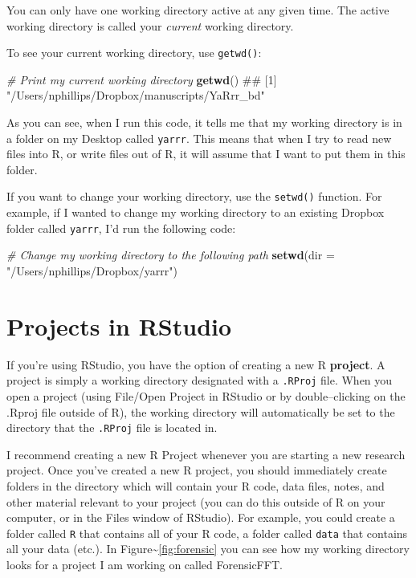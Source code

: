 \documentclass[]{book}
\newenvironment{Shaded}{\begin{snugshade}}{\end{snugshade}}
\newcommand{\KeywordTok}[1]{\textcolor[rgb]{0.13,0.29,0.53}{\textbf{{#1}}}}
\newcommand{\DataTypeTok}[1]{\textcolor[rgb]{0.13,0.29,0.53}{{#1}}}
\newcommand{\StringTok}[1]{\textcolor[rgb]{0.31,0.60,0.02}{{#1}}}
\newcommand{\CommentTok}[1]{\textcolor[rgb]{0.56,0.35,0.01}{\textit{{#1}}}}
\newcommand{\NormalTok}[1]{{#1}}
\theoremstyle{definition}
\theoremstyle{definition}
\theoremstyle{remark}
\begin{document}
You can only have one working directory active at any given time. The
active working directory is called your \emph{current} working
directory.

To see your current working directory, use \texttt{getwd()}:

\begin{Shaded}
\begin{Highlighting}[]
\CommentTok{# Print my current working directory}
\KeywordTok{getwd}\NormalTok{()}
\NormalTok{## [1] "/Users/nphillips/Dropbox/manuscripts/YaRrr_bd"}
\end{Highlighting}
\end{Shaded}

As you can see, when I run this code, it tells me that my working
directory is in a folder on my Desktop called \texttt{yarrr}. This means
that when I try to read new files into R, or write files out of R, it
will assume that I want to put them in this folder.

If you want to change your working directory, use the \texttt{setwd()}
function. For example, if I wanted to change my working directory to an
existing Dropbox folder called \texttt{yarrr}, I'd run the following
code:

\begin{Shaded}
\begin{Highlighting}[]
\CommentTok{# Change my working directory to the following path}
\KeywordTok{setwd}\NormalTok{(}\DataTypeTok{dir =} \StringTok{"/Users/nphillips/Dropbox/yarrr"}\NormalTok{)}
\end{Highlighting}
\end{Shaded}

\section{Projects in RStudio}\label{projects-in-rstudio}

If you're using RStudio, you have the option of creating a new R
\textbf{project}. A project is simply a working directory designated
with a \texttt{.RProj} file. When you open a project (using File/Open
Project in RStudio or by double--clicking on the .Rproj file outside of
R), the working directory will automatically be set to the directory
that the \texttt{.RProj} file is located in.

I recommend creating a new R Project whenever you are starting a new
research project. Once you've created a new R project, you should
immediately create folders in the directory which will contain your R
code, data files, notes, and other material relevant to your project
(you can do this outside of R on your computer, or in the Files window
of RStudio). For example, you could create a folder called \texttt{R}
that contains all of your R code, a folder called \texttt{data} that
contains all your data (etc.). In
Figure\textasciitilde{}\ref{fig:forensic} you can see how my working
directory looks for a project I am working on called ForensicFFT.
\end{document}
